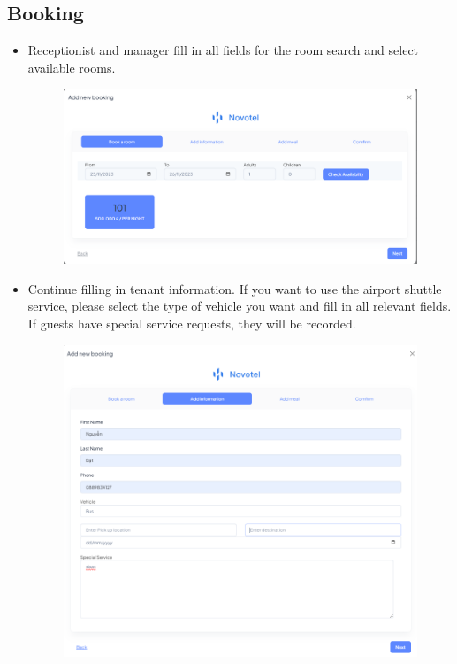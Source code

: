     \subsection{Booking}
    \begin{itemize}
        \item Receptionist and manager fill in all fields for the room search and select available rooms.
        \begin{figure}[H]
            \includegraphics[width=1\linewidth]{img/bookroom.png}
            \label{fig:bookroom}
        \end{figure}
        \item Continue filling in tenant information. If you want to use the airport shuttle service, please select the type of vehicle you want and fill in all relevant fields. If guests have special service requests, they will be recorded.
        \begin{figure}[H]
            \includegraphics[width=1\linewidth]{img/addinfor.png}

\end{figure}
\end{itemize}
